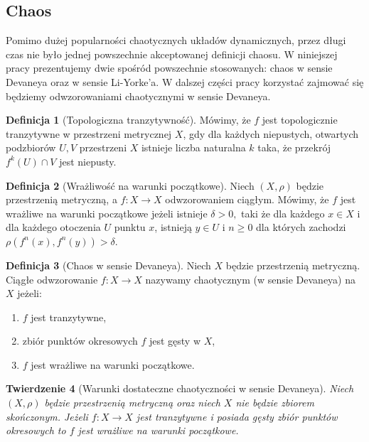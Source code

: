 \documentclass[licencjacka]{pwr_wmat_praca_dyplomowa}
\theoremstyle{plain}
\newtheorem{theorem}{Twierdzenie}
\numberwithin{theorem}{chapter}
\theoremstyle{definition}
\numberwithin{theorem}{chapter}
\newtheorem{definition}[theorem]{Definicja}
\begin{document}
\subsection{Chaos}


Pomimo dużej popularności chaotycznych układów dynamicznych, przez długi czas nie było jednej powszechnie akceptowanej definicji chaosu. W niniejszej pracy prezentujemy dwie spośród powszechnie stosowanych: chaos w sensie Devaneya oraz w sensie Li-Yorke'a. W dalszej części pracy korzystać zajmować się będziemy odwzorowaniami chaotycznymi w sensie Devaneya.

\begin{definition}[Topologiczna tranzytywność]
\cite{onDeveneyDefinitionOfChaos}
Mówimy, że $f$ jest topologicznie tranzytywne w przestrzeni metrycznej $X$, gdy dla każdych niepustych, otwartych podzbiorów $U, V$ przestrzeni $X$ istnieje liczba naturalna $k$ taka, że przekrój $f^k(U) \cap V$ jest niepusty.
\end{definition}

\begin{definition}[Wrażliwość na warunki początkowe]
\cite{balibrea2003topological}
Niech $(X, \rho)$ będzie przestrzenią metryczną, a $f: X \rightarrow X$ odwzorowaniem ciągłym.
Mówimy, że $f$ jest wrażliwe na warunki początkowe jeżeli  istnieje $\delta > 0,$ taki że dla każdego $x \in X$ i dla każdego otoczenia $U$ punktu $x$, istnieją $y \in U$ i $n \geq 0$ dla których zachodzi $\rho(f^n(x), f^n(y)) > \delta$.
\end{definition}

\begin{definition}[Chaos w sensie Devaneya]
Niech $X$ będzie przestrzenią metryczną. Ciągłe odwzorowanie $f: X \rightarrow X$ nazywamy chaotycznym (w sensie Devaneya) na $X$ jeżeli:
\begin{enumerate}
\item $f$ jest tranzytywne,
\item zbiór punktów okresowych $f$ jest gęsty w $X$,
\item $f$ jest wrażliwe na warunki początkowe.
\end{enumerate}
\end{definition}


\begin{theorem}
[Warunki dostateczne chaotyczności w sensie Devaneya]
\label{warunki_dostateczne_chaotycznosci_devaneya}
\cite{onDeveneyDefinitionOfChaos}
Niech $(X, \rho)$ będzie przestrzenią metryczną oraz niech $X$ nie będzie zbiorem skończonym.
Jeżeli $f: X \rightarrow X$ jest tranzytywne i posiada gęsty zbiór punktów okresowych to $f$ jest wrażliwe na warunki początkowe.
\end{theorem}
\end{document}
